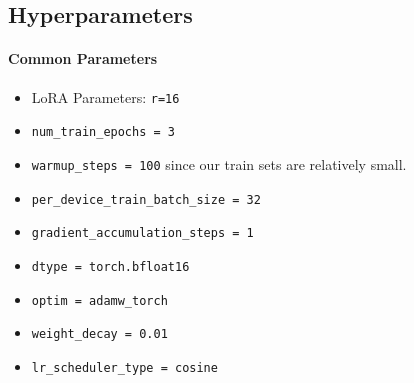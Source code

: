 \begin{table}[!ht]
    \centering
       \caption{Per-class Coherence Relation Prediction of Fine-tuned LLama 3.2 Vision 11B (FT-Llama) on the CLUE Multi-Label dataset. The Coherence Relations predicted are Visible, Subjective (Subj), Action, Story and Meta with multiple relations being applicable to a single image-text pair.}
        \label{table:metrics_clue_ml_finetuned}
\end{table}


\subsection{Hyperparameters} \label{appendix-hyperparams}
\paragraph{Common Parameters}
\begin{itemize}
    \item LoRA Parameters: \texttt{r=16}
    \item \texttt{num\_train\_epochs = 3}
    \item \texttt{warmup\_steps = 100} since our train sets are relatively small.
    \item \texttt{per\_device\_train\_batch\_size = 32}
    \item \texttt{gradient\_accumulation\_steps = 1}
    \item \texttt{dtype = torch.bfloat16}
    \item \texttt{optim = adamw\_torch}
    \item \texttt{weight\_decay = 0.01}
    \item \texttt{lr\_scheduler\_type = cosine}
\end{itemize}

